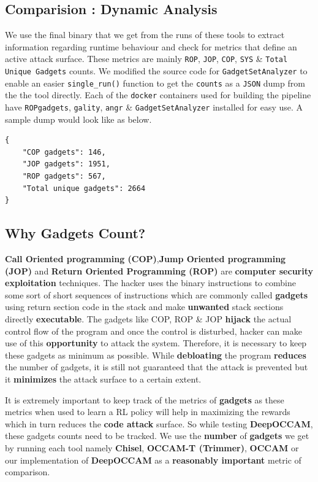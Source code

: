 \documentclass{relatorio}
\begin{document}
\subsection{Comparision : Dynamic Analysis}%
\label{Tools}

We use the final binary that we get from the runs of these tools to extract information regarding runtime behaviour and check for metrics that define an active attack surface. These metrics are mainly \texttt{ROP}, \texttt{JOP}, \texttt{COP}, \texttt{SYS} \& \texttt{Total Unique Gadgets} counts. We modified the source code for \texttt{GadgetSetAnalyzer} to enable an easier \texttt{single\_run()} function to get the \texttt{counts} as a \texttt{JSON} dump from the the tool directly. Each of the \texttt{docker} containers used for building the pipeline
have \texttt{ROPgadgets}, \texttt{gality}, \texttt{angr} \& \texttt{GadgetSetAnalyzer} installed for easy use. A sample dump would look like as below.
\begin{lstlisting}
{
	"COP gadgets": 146,
	"JOP gadgets": 1951,
	"ROP gadgets": 567,
	"Total unique gadgets": 2664
}
\end{lstlisting} 

\subsection{Why Gadgets Count?}%
\label{Tools}

\textbf{Call Oriented programming (COP)},\textbf{Jump Oriented programming (JOP)} and \textbf{Return Oriented Programming (ROP)} are \textbf{computer security exploitation} techniques. The hacker uses the binary instructions to combine some sort of short sequences of instructions which are commonly called \textbf{gadgets} using return section code in the stack and make \textbf{unwanted} stack sections directly \textbf{executable}. The gadgets like COP, ROP \& JOP \textbf{hijack} the actual control flow of the program and once the control is disturbed, hacker can make use of this \textbf{opportunity} to attack the system. Therefore, it is necessary to keep these gadgets as minimum as possible. While \textbf{debloating} the program \textbf{reduces} the number of gadgets, it is still not guaranteed that the attack is prevented but it \textbf{minimizes} the attack surface to a certain extent.

It is extremely important to keep track of the metrics of \textbf{gadgets} as these metrics when used to learn a RL policy will help in maximizing the rewards which in turn reduces the \textbf{code attack} surface. So while testing \textbf{DeepOCCAM}, these gadgets counts need to be tracked. We use the \textbf{number} of \textbf{gadgets} we get by running each tool namely \textbf{Chisel}, \textbf{OCCAM-T (Trimmer)}, \textbf{OCCAM} or our implementation of \textbf{DeepOCCAM} as a \textbf{\color{ao(english)} reasonably important} metric of comparison.
\end{document}
